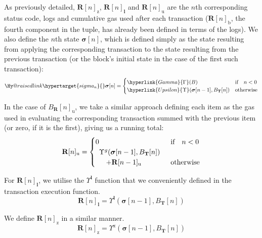 \documentclass[9pt,oneside]{amsart}
\makeatletter
\newcommand{\linkdest}[1]{\Hy@raisedlink{\hypertarget{#1}{}}}
\makeatother
\begin{document}
\begin{multicols}{2}
As previously detailed, $\mathbf{R}[n]_{\mathrm{z}}$, $\mathbf{R}[n]_{\mathbf{l}}$ and $\mathbf{R}[n]_{\mathrm{u}}$ are the $n$th corresponding status code, logs and cumulative gas used after each transaction ($\mathbf{R}[n]_{\mathrm{b}}$, the fourth component in the tuple, has already been defined in terms of the logs). We also define the $n$th state $\boldsymbol{\sigma}[n]$, which is defined simply as the state resulting from applying the corresponding transaction to the state resulting from the previous transaction (or the block's initial state in the case of the first such transaction):
\begin{equation}\linkdest{sigma_n}{}
\boldsymbol{\sigma}[n] = \begin{cases} \hyperlink{Gamma}{\Gamma}(B) & \text{if} \quad n < 0 \\ \hyperlink{Upsilon}{\Upsilon}(\boldsymbol{\sigma}[n - 1], B_{\mathbf{T}}[n]) & \text{otherwise} \end{cases}
\end{equation}

In the case of $B_{\mathbf{R}}[n]_{\mathrm{u}}$, we take a similar approach defining each item as the gas used in evaluating the corresponding transaction summed with the previous item (or zero, if it is the first), giving us a running total:
\begin{equation}
\mathbf{R}[n]_{\mathrm{u}} = \begin{cases} 0 & \text{if} \quad n < 0 \\
\begin{array}[b]{l}
\Upsilon^g(\boldsymbol{\sigma}[n - 1], B_{\mathbf{T}}[n])\\ \quad + \mathbf{R}[n-1]_{\mathrm{u}}
\end{array}
 & \text{otherwise} \end{cases}
\end{equation}

For $\mathbf{R}[n]_{\mathbf{l}}$, we utilise the \hyperlink{Upsilon_pow_l}{$\Upsilon^\mathbf{l}$} function that we conveniently defined in the transaction execution function.
\begin{equation}
\mathbf{R}[n]_{\mathbf{l}} =
\Upsilon^{\mathbf{l}}(\boldsymbol{\sigma}[n - 1], B_{\mathbf{T}}[n])
\end{equation}

We define \hyperlink{Upsilon_pow_z}{$\mathbf{R}[n]_{\mathrm{z}}$} in a similar manner.
\begin{equation}
\mathbf{R}[n]_{\mathrm{z}} =
\Upsilon^{\mathrm{z}}(\boldsymbol{\sigma}[n - 1], B_{\mathbf{T}}[n])
\end{equation}


\end{multicols}
\end{document}
